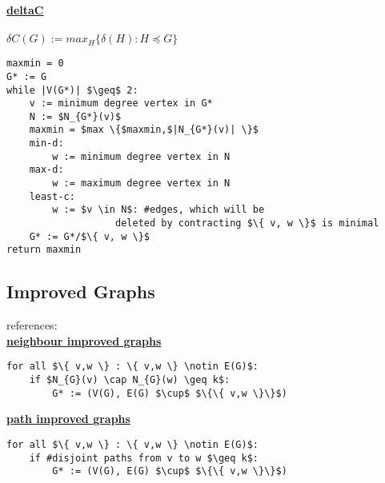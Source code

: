 \documentclass[a4wide]{article}
\begin{document}
\begin{algorithm}
\begin{algorithmic}[1]
\end{algorithmic}
\end{algorithm}

\underline{\textbf{deltaC}} \cite{B_lb_db,B_tc2, GD_lb_bb} \\ \\
$ \delta C(G) := max_{H} \{ \delta (H) : H \preceq G \}$ \\
\begin{lstlisting}[mathescape]
maxmin = 0
G* := G
while |V(G*)| $\geq$ 2:
    v := minimum degree vertex in G*
    N := $N_{G*}(v)$
    maxmin = $max \{$maxmin,$|N_{G*}(v)| \}$
    min-d:
        w := minimum degree vertex in N
    max-d:
        w := maximum degree vertex in N
    least-c:
        w := $v \in N$: #edges, which will be 
                   deleted by contracting $\{ v, w \}$ is minimal
    G* := G*/$\{ v, w \}$
return maxmin
\end{lstlisting}

\subsection{Improved Graphs}

references: \cite{B_tc2, B_lb_ne, CC_lb_nw, B_lb_lt, B_lb_ct} \\

\underline{\textbf{neighbour improved graphs}}
\begin{lstlisting}[mathescape]
for all $\{ v,w \} : \{ v,w \} \notin E(G)$: 
    if $N_{G}(v) \cap N_{G}(w) \geq k$:
        G* := (V(G), E(G) $\cup$ $\{\{ v,w \}\}$)
\end{lstlisting}

\vspace*{3mm}

\underline{\textbf{path improved graphs}}
\begin{lstlisting}[mathescape]
for all $\{ v,w \} : \{ v,w \} \notin E(G)$: 
    if #disjoint paths from v to w $\geq k$:
        G* := (V(G), E(G) $\cup$ $\{\{ v,w \}\}$)
\end{lstlisting} 
\end{document}

